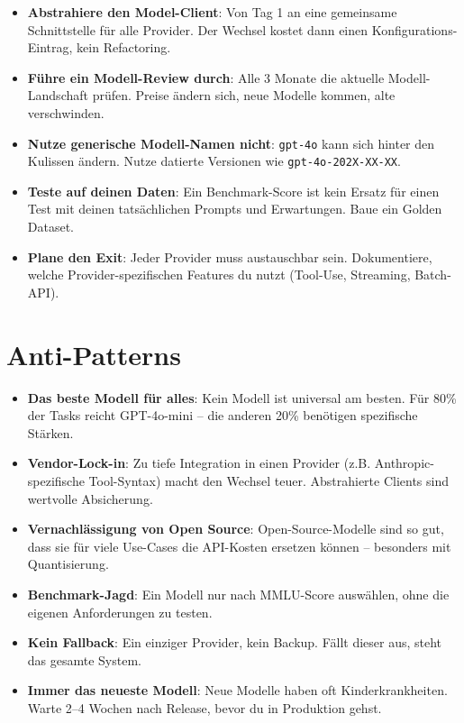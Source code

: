 \begin{itemize}[leftmargin=*]
    \item \textbf{Abstrahiere den Model-Client}: Von Tag 1 an eine gemeinsame Schnittstelle für alle Provider. Der Wechsel kostet dann einen Konfigurations-Eintrag, kein Refactoring.
    \item \textbf{Führe ein Modell-Review durch}: Alle 3 Monate die aktuelle Modell-Landschaft prüfen. Preise ändern sich, neue Modelle kommen, alte verschwinden.
    \item \textbf{Nutze generische Modell-Namen nicht}: \texttt{gpt-4o} kann sich hinter den Kulissen ändern. Nutze datierte Versionen wie \texttt{gpt-4o-202X-XX-XX}.
    \item \textbf{Teste auf deinen Daten}: Ein Benchmark-Score ist kein Ersatz für einen Test mit deinen tatsächlichen Prompts und Erwartungen. Baue ein Golden Dataset.
    \item \textbf{Plane den Exit}: Jeder Provider muss austauschbar sein. Dokumentiere, welche Provider-spezifischen Features du nutzt (Tool-Use, Streaming, Batch-API).
\end{itemize}

\section{Anti-Patterns}

\begin{itemize}[leftmargin=*]
    \item \textbf{Das beste Modell für alles}: Kein Modell ist universal am besten. Für 80\% der Tasks reicht GPT-4o-mini -- die anderen 20\% benötigen spezifische Stärken.
    \item \textbf{Vendor-Lock-in}: Zu tiefe Integration in einen Provider (z.B. Anthropic-spezifische Tool-Syntax) macht den Wechsel teuer. Abstrahierte Clients sind wertvolle Absicherung.
    \item \textbf{Vernachlässigung von Open Source}: Open-Source-Modelle sind so gut, dass sie für viele Use-Cases die API-Kosten ersetzen können -- besonders mit Quantisierung.
    \item \textbf{Benchmark-Jagd}: Ein Modell nur nach MMLU-Score auswählen, ohne die eigenen Anforderungen zu testen.
    \item \textbf{Kein Fallback}: Ein einziger Provider, kein Backup. Fällt dieser aus, steht das gesamte System.
    \item \textbf{Immer das neueste Modell}: Neue Modelle haben oft Kinderkrankheiten. Warte 2--4 Wochen nach Release, bevor du in Produktion gehst.
\end{itemize}

